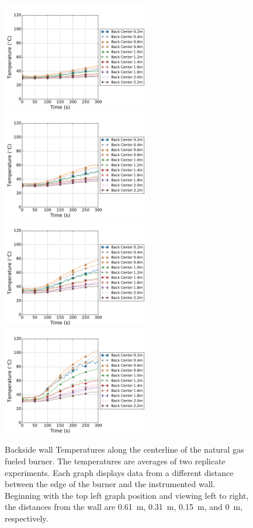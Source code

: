 \documentclass[twoside]{uocthesis}
\begin{document}
{\begin{figure}[ht!]
	\centering
	\includegraphics[width=2.5in]{../Figures/TWNG01_TC_Back_Center_Avg}
	\includegraphics[width=2.5in]{../Figures/TWNG03_TC_Back_Center_Avg}\\
	\includegraphics[width=2.5in]{../Figures/TWNG05_TC_Back_Center_Avg}
	\includegraphics[width=2.5in]{../Figures/TWNG07_TC_Back_Center_Avg}\\
	\caption[Backside wall temperatures along the centerline of the natural gas fueled burner]{Backside wall Temperatures along the centerline of the natural gas fueled burner. The temperatures are averages of two replicate experiments. Each graph displays data from a different distance between the edge of the burner and the instrumented wall. Beginning with the top left graph position and viewing left to right, the distances from the wall are 0.61~m, 0.31~m, 0.15~m, and 0~m, respectively.}
	\label{TC_Back_Center_TWNG_comp}
\end{figure}

}
\end{document}

